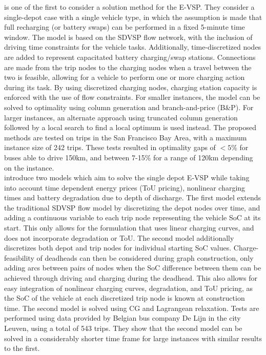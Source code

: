 \documentclass[]{article}
\begin{document}
\citet{Li2014} is one of the first to consider a solution method for the E-VSP. They consider a single-depot case with a single vehicle type, in which the assumption is made that full recharging (or battery swaps) can be performed in a fixed 5-minute time window. The model is based on the SDVSP flow network, with the inclusion of driving time constraints for the vehicle tasks. Additionally, time-discretized nodes are added to represent capacitated battery charging/swap stations. Connections are made from the trip nodes to the charging nodes when a travel between the two is feasible, allowing for a vehicle to perform one or more charging action during its task. By using discretized charging nodes, charging station capacity is enforced with the use of flow constraints. For smaller instances, the model can be solved to optimality using column generation and branch-and-price (B\&P). For larger instances, an alternate approach using truncated column generation followed by a local search to find a local optimum is used instead. The proposed methods are tested on trips in the San Francisco Bay Area, with a maximum instance size of 242 trips. These tests resulted in optimality gaps of $<5\%$ for buses able to drive 150km, and between 7-15\%  for a range of 120km depending on the instance. \\
 introduce two models which aim to solve the single depot E-VSP while taking into account time dependent energy prices (ToU pricing), nonlinear charging times and battery degradation due to depth of discharge. The first model extends the traditional SDVSP flow model by discretizing the depot nodes over time, and adding a continuous variable to each trip node representing the vehicle SoC at its start. This only allows for the formulation that uses linear charging curves, and does not incorporate degradation or ToU. The second model additionally discretizes both depot and trip nodes for individual starting SoC values. Charge-feasibility of deadheads can then be considered during graph construction, only adding arcs between pairs of nodes when the SoC difference between them can be achieved through driving and charging during the deadhead. This also allows for easy integration of nonlinear charging curves, degradation, and ToU pricing, as the SoC of the vehicle at each discretized trip node is known at construction time. The second model is solved using CG and Lagrangean relaxation. Tests are performed using data provided by Belgian bus company De Lijn in the city Leuven, using a total of 543 trips. They show that the second model can be solved in a considerably shorter time frame for large instances with similar results to the first. \\  
\end{document}
